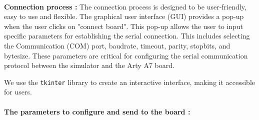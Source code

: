 \documentclass{article}
\begin{document}
\paragraph{}\textbf{Connection process :} The connection process is designed to be user-friendly, easy to use and flexible. The graphical user interface (GUI) provides a pop-up when the user clicks on "connect board". This pop-up allows the user to input specific parameters for establishing the serial connection. This includes selecting the Communication (COM) port, baudrate, timeout, parity, stopbits, and bytesize. These parameters are critical for configuring the serial communication protocol between the simulator and the Arty A7 board.

We use the \texttt{tkinter} library to create an interactive interface, making it accessible for users. 
\paragraph{The parameters to configure and send to the board :}
\end{document}
